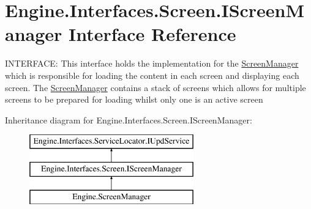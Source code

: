 \hypertarget{a00470}{}\section{Engine.\+Interfaces.\+Screen.\+I\+Screen\+Manager Interface Reference}
\label{a00470}


I\+N\+T\+E\+R\+F\+A\+CE\+: This interface holds the implementation for the \hyperlink{a00538}{Screen\+Manager} which is responsible for loading the content in each screen and displaying each screen. The \hyperlink{a00538}{Screen\+Manager} contains a stack of screens which allows for multiple screens to be prepared for loading whilst only one is an active screen  


Inheritance diagram for Engine.\+Interfaces.\+Screen.\+I\+Screen\+Manager\+:\begin{figure}[H]
\begin{center}
\leavevmode
\includegraphics[height=3.000000cm]{d0/d29/a00470}
\end{center}
\end{figure}
